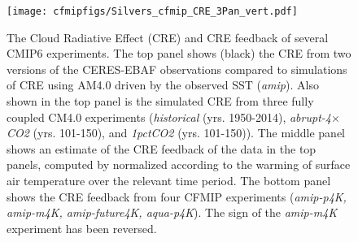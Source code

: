\documentclass[draft]{agujournal2019}
\begin{document}
\begin{figure}
  \centering
  \texttt{[image: cfmipfigs/Silvers\_cfmip\_CRE\_3Pan\_vert.pdf]}
  \caption{The Cloud Radiative Effect (CRE) and CRE feedback of several CMIP6 experiments.  The top panel 
  shows (black) the CRE from two versions of the CERES-EBAF observations compared to 
  simulations of CRE using AM4.0 driven by the observed SST (\textit{amip}).  Also 
  shown in the top panel is the simulated CRE from three fully coupled CM4.0 experiments (\textit{historical} (yrs. 1950-2014),
  \textit{abrupt-4$\times$CO2} (yrs. 101-150), and \textit{1pctCO2} (yrs. 101-150)).  The middle panel shows an estimate of the 
  CRE feedback of the data in the top panels, computed by normalized according to the warming of surface air temperature over 
  the relevant time period.  The bottom panel shows the CRE feedback from four 
  CFMIP experiments (\textit{amip-p4K, amip-m4K, amip-future4K, aqua-p4K}).  The sign of the \textit{amip-m4K} experiment has 
  been reversed.}
  \label{fig:CRE_feedback}
\end{figure}    
\end{document}
